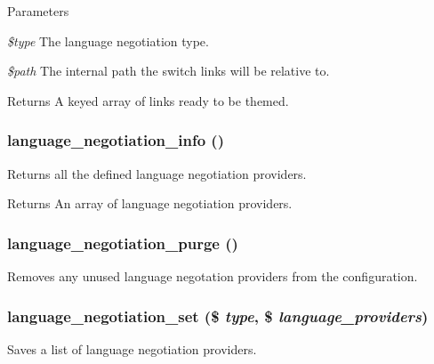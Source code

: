 \begin{DoxyParams}{Parameters}
\item[{\em \$type}]The language negotiation type. \item[{\em \$path}]The internal path the switch links will be relative to.\end{DoxyParams}
\begin{DoxyReturn}{Returns}
A keyed array of links ready to be themed. 
\end{DoxyReturn}
\hypertarget{group__language__negotiation_ga5e41e506c539a01a4ee945857c526e78}{
\subsubsection[{language\_\-negotiation\_\-info}]{\setlength{\rightskip}{0pt plus 5cm}language\_\-negotiation\_\-info ()}}
\label{group__language__negotiation_ga5e41e506c539a01a4ee945857c526e78}
Returns all the defined language negotiation providers.

\begin{DoxyReturn}{Returns}
An array of language negotiation providers. 
\end{DoxyReturn}
\hypertarget{group__language__negotiation_ga3a0f894378f49038dbbaf35909a8e215}{
\subsubsection[{language\_\-negotiation\_\-purge}]{\setlength{\rightskip}{0pt plus 5cm}language\_\-negotiation\_\-purge ()}}
\label{group__language__negotiation_ga3a0f894378f49038dbbaf35909a8e215}
Removes any unused language negotation providers from the configuration. \hypertarget{group__language__negotiation_ga3a4f8df0ad1b5fef7399929111bab35a}{
\subsubsection[{language\_\-negotiation\_\-set}]{\setlength{\rightskip}{0pt plus 5cm}language\_\-negotiation\_\-set (\$ {\em type}, \/  \$ {\em language\_\-providers})}}
\label{group__language__negotiation_ga3a4f8df0ad1b5fef7399929111bab35a}
Saves a list of language negotiation providers.


